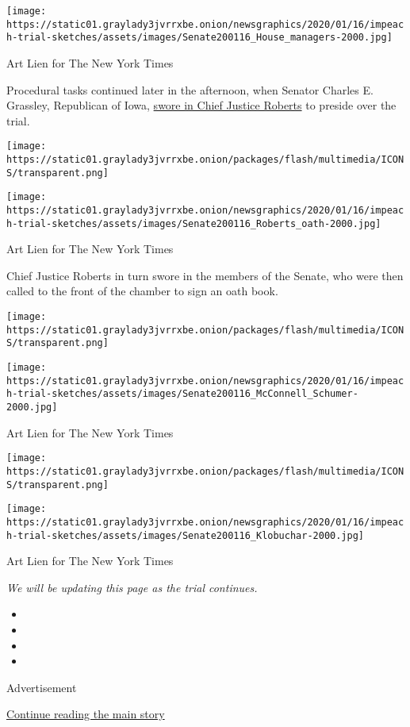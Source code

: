 \texttt{[image: https://static01.graylady3jvrrxbe.onion/newsgraphics/2020/01/16/impeach-trial-sketches/assets/images/Senate200116\_House\_managers-2000.jpg]}

Art Lien for The New York Times

Procedural tasks continued later in the afternoon, when Senator Charles
E. Grassley, Republican of Iowa,
\href{https://www.nytimes3xbfgragh.onion/2020/01/16/us/politics/impeachment-trial.html\#link-459e7e1d}{swore
in Chief Justice Roberts} to preside over the trial.

\texttt{[image: https://static01.graylady3jvrrxbe.onion/packages/flash/multimedia/ICONS/transparent.png]}

\texttt{[image: https://static01.graylady3jvrrxbe.onion/newsgraphics/2020/01/16/impeach-trial-sketches/assets/images/Senate200116\_Roberts\_oath-2000.jpg]}

Art Lien for The New York Times

Chief Justice Roberts in turn swore in the members of the Senate, who
were then called to the front of the chamber to sign an oath book.

\texttt{[image: https://static01.graylady3jvrrxbe.onion/packages/flash/multimedia/ICONS/transparent.png]}

\texttt{[image: https://static01.graylady3jvrrxbe.onion/newsgraphics/2020/01/16/impeach-trial-sketches/assets/images/Senate200116\_McConnell\_Schumer-2000.jpg]}

Art Lien for The New York Times

\texttt{[image: https://static01.graylady3jvrrxbe.onion/packages/flash/multimedia/ICONS/transparent.png]}

\texttt{[image: https://static01.graylady3jvrrxbe.onion/newsgraphics/2020/01/16/impeach-trial-sketches/assets/images/Senate200116\_Klobuchar-2000.jpg]}

Art Lien for The New York Times

\emph{We will be updating this page as the trial continues.}

\begin{itemize}
\item
\item
\item
\item
\end{itemize}

Advertisement

\protect\hyperlink{after-bottom}{Continue reading the main story}


